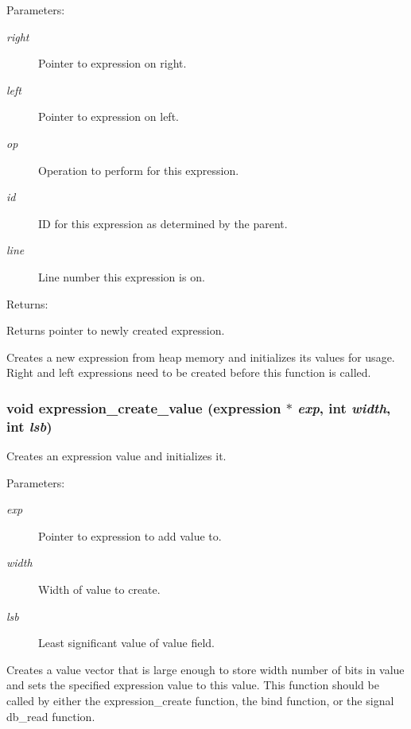 \begin{Desc}
\item[Parameters: ]\par
\begin{description}
\item[{\em 
right}]Pointer to expression on right. \item[{\em 
left}]Pointer to expression on left. \item[{\em 
op}]Operation to perform for this expression. \item[{\em 
id}]ID for this expression as determined by the parent. \item[{\em 
line}]Line number this expression is on.\end{description}
\end{Desc}
\begin{Desc}
\item[Returns: ]\par
Returns pointer to newly created expression.\end{Desc}
Creates a new expression from heap memory and initializes its values for usage. Right and left expressions need to be created before this function is called. 
\subsubsection{\setlength{\rightskip}{0pt plus 5cm}void expression\_\-create\_\-value ({\bf expression} $\ast$ {\em exp}, int {\em width}, int {\em lsb})}\label{expr_8h_a0}


Creates an expression value and initializes it.

\begin{Desc}
\item[Parameters: ]\par
\begin{description}
\item[{\em 
exp}]Pointer to expression to add value to. \item[{\em 
width}]Width of value to create. \item[{\em 
lsb}]Least significant value of value field.\end{description}
\end{Desc}
Creates a value vector that is large enough to store width number of bits in value and sets the specified expression value to this value. This function should be called by either the expression\_\-create function, the bind function, or the signal db\_\-read function. 
